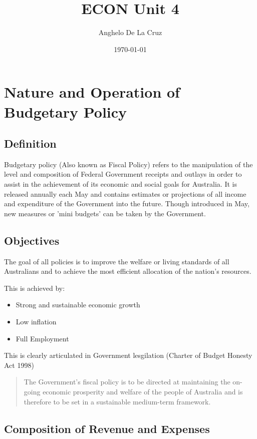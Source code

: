 \documentclass[11pt]{article}
\author{Anghelo De La Cruz}
\date{\today}
\title{ECON Unit 4}
\begin{document}
\maketitle
\tableofcontents


\section{Nature and Operation of Budgetary Policy}
\label{sec-1}

\subsection{Definition}
\label{sec-1-1}

Budgetary policy (Also known as Fiscal Policy) refers to the
manipulation of the level and composition of Federal Government
receipts and outlays in order to assist in the achievement of its
economic and social goals for Australia. It is released annually each
May and contains estimates or projections of all income and
expenditure of the Government into the future. Though introduced in
May, new measures or 'mini budgets' can be taken by the Government.

\subsection{Objectives}
\label{sec-1-2}

The goal of all policies is to improve the welfare or living standards
of all Australians and to achieve the most efficient allocation of the
nation's resources.

This is achieved by:

\begin{itemize}
\item Strong and sustainable economic growth
\item Low inflation
\item Full Employment
\end{itemize}

This is clearly articulated in Government lesgilation (Charter of
Budget Honesty Act 1998)

\begin{quote}
The Government's fiscal policy is to be directed at maintaining the
on-going economic prosperity and welfare of the people of Australia
and is therefore to be set in a sustainable medium-term framework.
\end{quote}

\subsection{Composition of Revenue and Expenses}
\label{sec-1-3}
\end{document}
